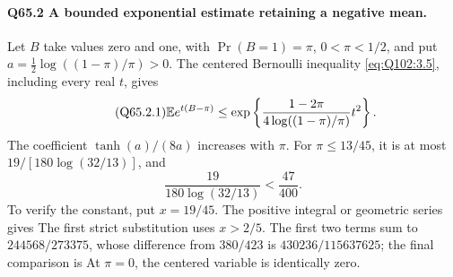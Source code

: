 \paragraph{Q65.2 A bounded exponential estimate retaining a negative mean.}\label{part:Q65:negative-mean}
Let \(B\) take values zero and one, with \(\Pr(B=\allowbreak 1)=\allowbreak \pi\),
\(0<\allowbreak \pi<\allowbreak 1/2\), and put
\(a=\allowbreak \tfrac12\log((1-\pi)/\pi)>\allowbreak 0\).
The centered Bernoulli inequality \eqref{eq:Q102:3.5}, including
every real \(t\), gives
\begin{equation}\tag{Q65.2.1}\label{eq:Q65:2.1}
\mathbb E e^{t(B-\pi)}\le
\exp\left\{\frac{1-2\pi}{4\log((1-\pi)/\pi)}t^2\right\}.
\end{equation}
The coefficient \(\tanh(a)/(8a)\) increases with \(\pi\).
For \(\pi\le\allowbreak 13/45\), it is at most \(19/[180\log(32/13)]\), and
\begin{equation}\tag{Q65.2.2}\label{eq:Q65:2.2}
\frac{19}{180\log(32/13)}<\frac{47}{400}.
\end{equation}
To verify the constant, put \(x=\allowbreak 19/45\). The positive integral or
geometric series gives
The first strict substitution uses \(x>\allowbreak 2/5\). The first two terms
sum to \(244568/273375\), whose difference from \(380/423\) is
\(430236/115637625\); the final comparison is
At \(\pi=\allowbreak 0\), the centered variable is identically zero.

